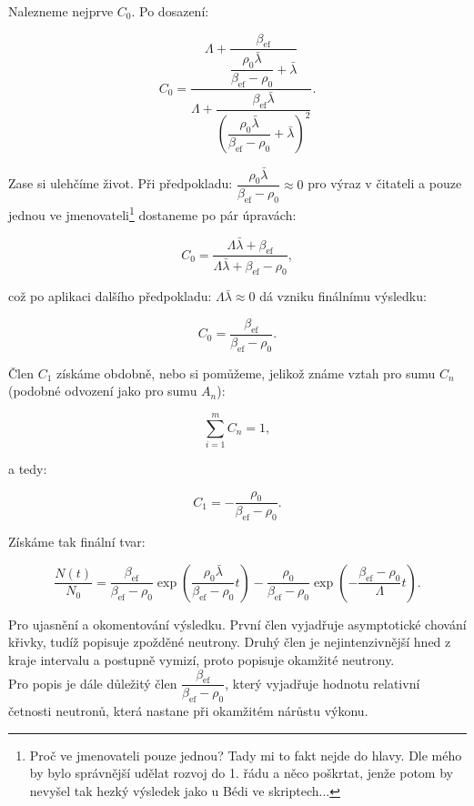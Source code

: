 Nalezneme nejprve $C_0$. Po dosazení:

$$ C_0 = \dfrac{\Lambda + \dfrac{\beta_{\text{ef}}}{\dfrac{\rho_0 \bar{\lambda}}{\beta_{\text{ef}} - \rho_0} + \bar{\lambda}}}{\Lambda  + \dfrac{\beta_{\text{ef}} \bar{\lambda}}{ \left ( \dfrac{\rho_0 \bar{\lambda}}{\beta_{\text{ef}} - \rho_0} + \bar{\lambda} \right ) ^2}}. $$

Zase si ulehčíme život. Při předpokladu: $\dfrac{\rho_0 \bar{\lambda}}{\beta_{\text{ef}} - \rho_0} \approx 0$ pro výraz v čitateli a pouze jednou ve jmenovateli\footnote{Proč ve jmenovateli pouze jednou? Tady mi to fakt nejde do hlavy. Dle mého by bylo správnější udělat rozvoj do 1. řádu a něco poškrtat, jenže potom by nevyšel tak hezký výsledek jako u Bédi ve skriptech...} dostaneme po pár úpravách:

$$ C_0 = \dfrac{\Lambda \bar{\lambda} + \beta_{\text{ef}}}{\Lambda \bar{\lambda} + \beta_{\text{ef}} - \rho_0}, $$

což po aplikaci dalšího předpokladu: $\Lambda \bar{\lambda} \approx 0$ dá vzniku finálnímu výsledku:

$$ C_0 = \dfrac{\beta_{\text{ef}}}{\beta_{\text{ef}} - \rho_0}. $$

Člen $C_1$ získáme obdobně, nebo si pomůžeme, jelikož známe vztah pro sumu $C_n$ (podobné odvození jako pro sumu $A_n$):

$$ \sum_{i = 1}^m C_n = 1, $$

a tedy:

$$ C_1 = -\dfrac{\rho_0}{\beta_{\text{ef}} - \rho_0}. $$

Získáme tak finální tvar:

\begin{equation}
  \boxed{
  \dfrac{N(t)}{N_0} = \dfrac{\beta_{\text{ef}}}{\beta_{\text{ef}} - \rho_0} \exp{\left ( \dfrac{\rho_0 \bar{\lambda}}{\beta_{\text{ef}} - \rho_0}t \right ) } - \dfrac{\rho_0}{\beta_{\text{ef}} - \rho_0} \exp{\left ( -\dfrac{\beta_{\text{ef}} - \rho_0}{\Lambda}t \right )}.
  \label{prechodova_charakteristika_priklad}}
\end{equation}

Pro ujasnění a okomentování výsledku. První člen vyjadřuje asymptotické chování křivky, tudíž popisuje zpožděné neutrony. Druhý člen je nejintenzivnější hned z kraje intervalu a postupně vymizí, proto popisuje okamžité neutrony.\\

Pro popis je dále důležitý člen $\dfrac{\beta_{\text{ef}}}{\beta_{\text{ef}} - \rho_0}$, který vyjadřuje hodnotu relativní četnosti neutronů, která nastane při okamžitém nárůstu výkonu.\\

